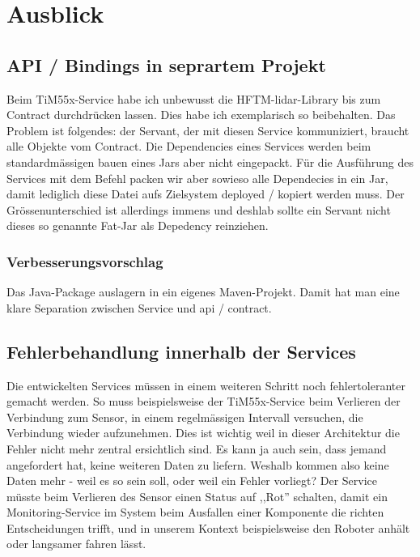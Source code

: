 \chapter{Ausblick}
\section{API / Bindings in seprartem Projekt}
\label{sec:separatebindings}
Beim TiM55x-Service habe ich unbewusst die HFTM-\acrshort{lidar}-Library bis zum Contract durchdrücken lassen. Dies habe ich exemplarisch so beibehalten. Das Problem ist folgendes: der Servant, der mit diesen Service kommuniziert, braucht alle Objekte vom Contract. Die Dependencies eines Services werden beim standardmässigen bauen eines Jars aber nicht eingepackt. Für die Ausführung des Services mit dem Befehl  packen wir aber sowieso alle Dependecies in ein Jar, damit lediglich diese Datei aufs Zielsystem deployed / kopiert werden muss. Der Grössenunterschied ist allerdings immens und deshlab sollte ein Servant nicht dieses so genannte Fat-Jar als Depedency reinziehen.

\subsection{Verbesserungsvorschlag}
Das Java-Package  auslagern in ein eigenes Maven-Projekt. Damit hat man eine klare Separation zwischen Service und \acrshort{api} / \Gls{contract}. 

\section{Fehlerbehandlung innerhalb der Services}
Die entwickelten Services müssen in einem weiteren Schritt noch fehlertoleranter gemacht werden. So muss beispielsweise der TiM55x-Service beim Verlieren der Verbindung zum Sensor, in einem regelmässigen Intervall versuchen, die Verbindung wieder aufzunehmen. Dies ist wichtig weil in dieser Architektur die Fehler nicht mehr zentral ersichtlich sind. Es kann ja auch sein, dass jemand angefordert hat, keine weiteren Daten zu liefern. Weshalb kommen also keine Daten mehr - weil es so sein soll, oder weil ein Fehler vorliegt? Der Service müsste beim Verlieren des Sensor einen Status auf ,,Rot'' schalten, damit ein Monitoring-Service im System beim Ausfallen einer Komponente die richten Entscheidungen trifft, und in unserem Kontext beispielsweise den Roboter anhält oder langsamer fahren lässt.

